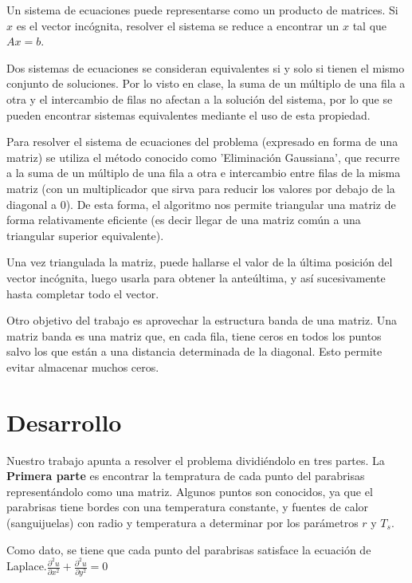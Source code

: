 \documentclass[a4paper]{article}
\begin{document}
Un sistema de ecuaciones puede representarse como un producto de matrices. Si $x$ es el vector incógnita, resolver el sistema se reduce a encontrar un $x$ tal que $Ax=b$.

Dos sistemas de ecuaciones se consideran equivalentes si y solo si tienen el mismo conjunto de soluciones. Por lo visto en clase, la suma de un múltiplo de una fila a otra y el intercambio de filas no afectan a la solución del sistema, por lo que se pueden encontrar sistemas equivalentes mediante el uso de esta propiedad.

Para resolver el sistema de ecuaciones del problema (expresado en forma de una matriz) se utiliza el método conocido como 'Eliminación Gaussiana', que recurre a la suma de un múltiplo de una fila a otra e intercambio entre filas de la misma matriz (con un multiplicador que sirva para reducir los valores por debajo de la diagonal a 0). De esta forma, el algoritmo nos permite triangular una matriz de forma relativamente eficiente (es decir llegar de una matriz común a una triangular superior equivalente).

Una vez triangulada la matriz, puede hallarse el valor de la última posición del vector incógnita, luego usarla para obtener la anteúltima, y así sucesivamente hasta completar todo el vector.

Otro objetivo del trabajo es aprovechar la estructura banda de una matriz. Una matriz banda es una matriz que, en cada fila, tiene ceros en todos los puntos salvo los que están a una distancia determinada de la diagonal. Esto permite evitar almacenar muchos ceros.

\newpage

\section{Desarrollo}
\label{sec:desarrollo}

Nuestro trabajo apunta a resolver el problema dividiéndolo en tres partes. \newline \newline
La \textbf{Primera parte} es encontrar la tempratura de cada punto del parabrisas  representándolo como una matriz. Algunos puntos son conocidos, ya que el parabrisas tiene bordes con una temperatura constante, y fuentes de calor (sanguijuelas) con radio y temperatura a determinar por los parámetros $r$ y $T_s$.

Como dato, se tiene que cada punto del parabrisas satisface la ecuación de Laplace.\newline $\frac{\partial ^2u}{\partial x^2}+\frac{\partial ^2u}{\partial y^2}=0$
\end{document}

